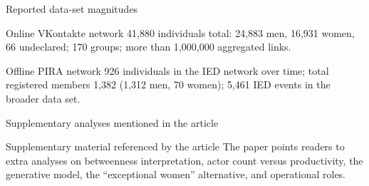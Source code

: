 \begin{frame}{Reported data-set magnitudes}
  \begin{block}{Online VKontakte network}
    41,880 individuals total: 24,883 men, 16,931 women, 66 undeclared; 170 groups; more than 1,000,000 aggregated links.
  \end{block}

  \begin{block}{Offline PIRA network}
    926 individuals in the IED network over time; total registered members 1,382 (1,312 men, 70 women); 5,461 IED events in the broader data set.
  \end{block}

\end{frame}

\begin{frame}{Supplementary analyses mentioned in the article}
  \begin{block}{Supplementary material referenced by the article}
    The paper points readers to extra analyses on betweenness interpretation, actor count versus productivity, the generative model, the ``exceptional women'' alternative, and operational roles.
  \end{block}

\end{frame}
